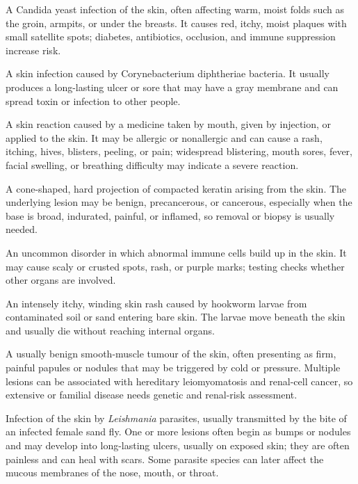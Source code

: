  A Candida yeast infection of the skin, often affecting warm, moist folds such as the groin, armpits, or under the breasts. It causes red, itchy, moist plaques with small satellite spots; diabetes, antibiotics, occlusion, and immune suppression increase risk.

 A skin infection caused by Corynebacterium diphtheriae bacteria. It usually produces a long-lasting ulcer or sore that may have a gray membrane and can spread toxin or infection to other people.

 A skin reaction caused by a medicine taken by mouth, given by injection, or applied to the skin. It may be allergic or nonallergic and can cause a rash, itching, hives, blisters, peeling, or pain; widespread blistering, mouth sores, fever, facial swelling, or breathing difficulty may indicate a severe reaction.

 A cone-shaped, hard projection of compacted keratin arising from the skin. The underlying lesion may be benign, precancerous, or cancerous, especially when the base is broad, indurated, painful, or inflamed, so removal or biopsy is usually needed.

 An uncommon disorder in which abnormal immune cells build up in the skin. It may cause scaly or crusted spots, rash, or purple marks; testing checks whether other organs are involved.

 An intensely itchy, winding skin rash caused by hookworm larvae from contaminated soil or sand entering bare skin. The larvae move beneath the skin and usually die without reaching internal organs.

 A usually benign smooth-muscle tumour of the skin, often presenting as firm, painful papules or nodules that may be triggered by cold or pressure. Multiple lesions can be associated with hereditary leiomyomatosis and renal-cell cancer, so extensive or familial disease needs genetic and renal-risk assessment.

 Infection of the skin by \textit{Leishmania} parasites, usually transmitted by the bite of an infected female sand fly. One or more lesions often begin as bumps or nodules and may develop into long-lasting ulcers, usually on exposed skin; they are often painless and can heal with scars. Some parasite species can later affect the mucous membranes of the nose, mouth, or throat.


